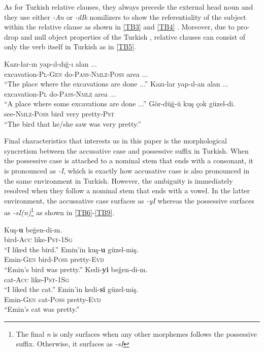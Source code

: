 \documentclass[doc]{apa6}
\let\rmarkdownfootnote\footnote%
\def\footnote{\protect\rmarkdownfootnote}
\begin{document}
As for Turkish relative clauses, they always precede the external head noun \autocites{Goksel2004}{Taylan2015} and they use either \emph{-An} or \emph{-dIk} nomilizers to show the referentiality of the subject within the relative clause as shown in \autoref{TB3} and \autoref{TB4} \autocite{Haig1997}. Moreover, due to pro-drop and null object properties of the Turkish \autocite[see][]{Ozturk2005}, relative clauses can consist of only the verb itself in Turkish as in \autoref{TB5}.

\begin{exe}
\ex \label{TB3}
\gll Kazı-lar-ın yap-ıl-dığ-ı alan ... \\
excavation-\textsc{Pl}-\textsc{Gen} do-\textsc{Pass}-\textsc{Nmlz}-\textsc{Poss} area ... \\
\glt ``The place where the excavations are done ...''
\ex \label{TB4}
\gll Kazı-lar yap-ıl-an alan ... \\
excavation-\textsc{Pl} do-\textsc{Pass}-\textsc{Nmlz} area ... \\
\glt ``A place where some excavations are done ...''
\ex \label{TB5}
\gll Gör-düğ-ü kuş çok güzel-di.\\
see-\textsc{Nmlz}-\textsc{Poss} bird very pretty-\textsc{Pst}\\
\glt ``The bird that he/she saw was very pretty.''
\end{exe}

Final characteristics that interests us in this paper is the morphological syncretism between the accusative case and possessive suffix in Turkish. When the possessive case is attached to a nominal stem that ends with a consonant, it is pronounced as \textit{-I}, which is exactly how accusative case is also pronounced in the same environment in Turkish. However, the ambiguity is immediately resolved when they follow a nominal stem that ends with a vowel. In the latter environment, the accussative case surfaces as \emph{-yI} whereas the possessive surfaces as \emph{-sI(n)}\footnote{The final \textit{n} is only surfaces when any other morphemes follows the possessive suffix. Otherwise, it surfaces as \textit{-sI}} as shown in \autoref{TB6}-\autoref{TB9}.

\begin{exe}
\ex
\begin{xlist}
\ex \label{TB6}
\gll Kuş-\textbf{u} beğen-di-m.\\
bird-\textsc{Acc} like-\textsc{Pst}-\textsc{1Sg}\\
\glt ``I liked the bird.''
\ex \label{TB7}
\gll Emin'in kuş-\textbf{u} güzel-miş.\\
Emin-\textsc{Gen} bird-\textsc{Poss} pretty-\textsc{Evd}\\
\glt ``Emin's bird was pretty.''
\ex \label{TB8}
\gll Kedi-\textbf{yi} beğen-di-m.\\
cat-\textsc{Acc} like-\textsc{Pst}-\textsc{1Sg}\\
\glt ``I liked the cat.''
\ex \label{TB9}
\gll Emin'in kedi-\textbf{si} güzel-miş.\\
Emin-\textsc{Gen} cat-\textsc{Poss} pretty-\textsc{Evd}\\
\glt ``Emin's cat was pretty.''
\end{xlist}
\end{exe}
\end{document}
